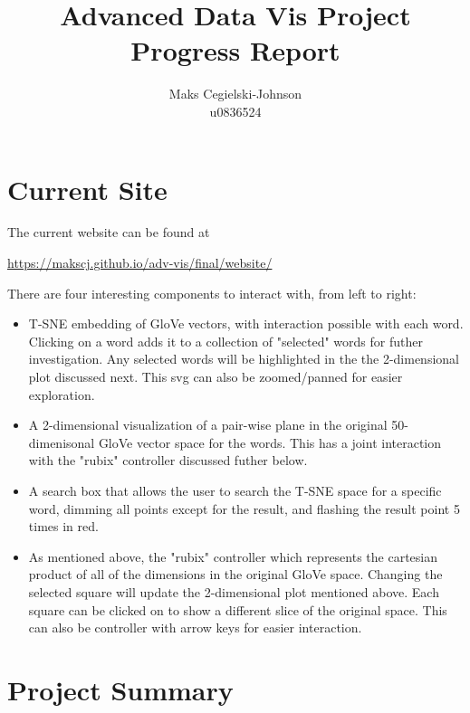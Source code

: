 \documentclass{article}
\title{Advanced Data Vis Project Progress Report}
\author{Maks Cegielski-Johnson\\u0836524}
\begin{document}
\maketitle


\section{Current Site}

The current website can be found at 

\url{https://makscj.github.io/adv-vis/final/website/}

There are four interesting components to interact with, from left to right:

\begin{itemize}
\item T-SNE embedding of GloVe vectors, with interaction possible with each word. Clicking on a word adds it to a collection of "selected" words for futher investigation. Any selected words will be highlighted in the the 2-dimensional plot discussed next. This svg can also be zoomed/panned for easier exploration. 
\item A 2-dimensional visualization of a pair-wise plane in the original 50-dimenisonal GloVe vector space for the words. This has a joint interaction with the "rubix" controller discussed futher below.
\item A search box that allows the user to search the T-SNE space for a specific word, dimming all points except for the result, and flashing the result point 5 times in red. 
\item As mentioned above, the "rubix" controller which represents the cartesian product of all of the dimensions in the original GloVe space. Changing the selected square will update the 2-dimensional plot mentioned above. Each square can be clicked on to show a different slice of the original space. This can also be controller with arrow keys for easier interaction.
\end{itemize}


\section{Project Summary}
\end{document}
